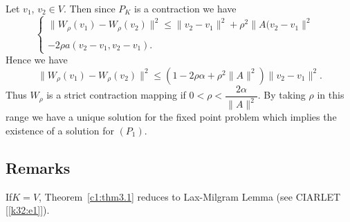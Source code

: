 Let $v_1$, $v_2 \in V$. Then since $P_K$ is a contraction we have 
\begin{equation*}
\begin{cases}
\parallel W_\rho (v_1) -W_\rho (v_2) \parallel ^2 \leq 
\parallel v_2 -v_1 \parallel ^2 + \rho^2 \parallel A(v_2- v_1 \parallel ^2 \\
&\\
-2\rho a(v_2-v_1, v_2-v_1).
\end{cases}
\end{equation*}
Hence we have 
\begin{equation}
\parallel W_\rho (v_1) - W_\rho (v_2) \parallel ^2 \leq (1 - 2 \rho 
\alpha +\rho^2 \parallel A \parallel ^2 ) \parallel v_2 - v_1
\parallel^2. \tag{3.7}\label{c1:eq3.7}
\end{equation}
Thus $W_\rho$ is a strict contraction mapping if $0 < \rho < \dfrac{2
  \alpha}{\parallel A \parallel^2}$. By taking $\rho$ in this range we
have a unique solution for the fixed point problem which implies the
existence of a solution for $(P_1)$.  

\subsection{Remarks}\label{c1:ss3.2}%

\begin{remark}\label{c1:rem3.1}%
If\pageoriginale $K = V$, Theorem~\ref{c1:thm3.1} reduces to Lax-Milgram Lemma 
(see CIARLET [\ref{k32:e1}]). 
\end{remark}

